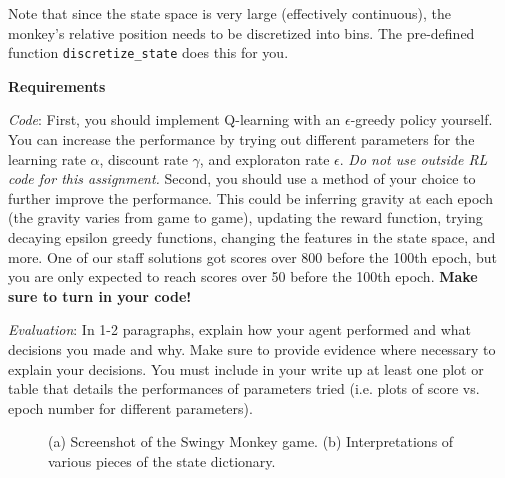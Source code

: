 \documentclass[submit]{harvardml}
\begin{document}
\begin{problem}
Note that since the state space is very large (effectively continuous), the monkey's relative position needs to be discretized into bins. The pre-defined function \verb|discretize_state| does this for you.

\textbf{Requirements}

\textit{Code}: First, you should implement Q-learning with an
$\epsilon$-greedy policy yourself. You can increase the performance by
trying out different parameters for the learning rate $\alpha$,
discount rate $\gamma$, and exploraton rate $\epsilon$. \emph{Do not use outside RL code for this assignment.} Second, you should use a method of your choice to further improve the performance. This could be inferring gravity at each epoch (the gravity varies from game to game), updating the reward function, trying decaying epsilon greedy functions, changing the features in the state space, and more. One of our staff solutions got scores over 800 before the 100th epoch, but you are only expected to reach scores over 50 before the 100th epoch. {\bf Make sure to turn in your code!} 

\textit{Evaluation}: In 1-2 paragraphs, explain how your agent performed and what decisions you made and why. Make sure to provide evidence where necessary to explain your decisions. You must include in your write up at least one plot or table that details the performances of parameters tried (i.e. plots of score vs. epoch number for different parameters).
\end{problem}

\begin{figure}[H]
    \centering
    \hfill
    \caption{(a) Screenshot of the Swingy Monkey game.  (b) Interpretations of various pieces of the state dictionary.}
\end{figure}
    
\end{document}
